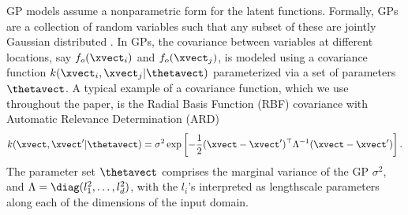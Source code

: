 GP models assume a nonparametric form for the latent functions.
Formally, GPs are a collection of random variables such that any subset of these are jointly Gaussian distributed \citep{Rasmussen06}.
In GPs, the covariance between variables at different locations, say $f_o(\xvect_i)$ and $f_o(\xvect_j)$, is modeled using a covariance function $k(\xvect_i, \xvect_j | \thetavect)$ parameterized via a set of parameters $\thetavect$.
A typical example of a covariance function, which we  use throughout the paper, 
is the Radial Basis Function (RBF) covariance with Automatic Relevance Determination (ARD)~\citep{Mackay94}
\begin{equation} \label{eq:kernel:rbf:ard}
k(\xvect, \xvect^{\prime} | \thetavect) = 
\sigma^2 \exp\left[-\frac{1}{2} (\xvect - \xvect^{\prime})^{\top} \Lambda^{-1} (\xvect - \xvect^{\prime}) \right] \text{.}
\end{equation}
The parameter set $\thetavect$ comprises the marginal variance of the GP $\sigma^2$, and $\Lambda = \diag(l_1^2, \ldots, l_d^2)$, with the $l_i$'s interpreted as lengthscale parameters along each of the dimensions of the input domain.

